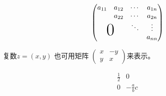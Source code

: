 \documentclass{ctexart}
\begin{document}
    \[
    \begin{pmatrix}
        a_{11}&a_{12}&\cdots&a_{1n}\\
        &a_{22}&\cdots&a_{2n}\\
        & &\ddots&\vdots\\
        \multicolumn{2}{c}{\raisebox{1.3ex}[0pt]{\Huge 0}}& &a_{nn}
    \end{pmatrix}
    \]

    复数$z=(x,y)$ 也可用矩阵
    \begin{math}
    \left( %
    \begin{smallmatrix}
    x & -y \\ y & x
    \end{smallmatrix}
    \right) %
    \end{math}来表示。

    \[
    \begin{array}{r|r}
    \frac12 & 0 \\
    \hline
    0 & -\frac abc \\
    \end{array}
    \]
\end{document}
